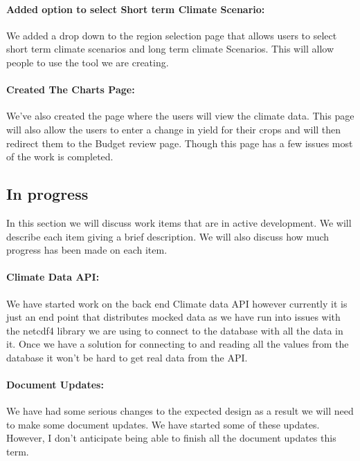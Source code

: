 \documentclass[onecolumn, draftclsnofoot,10pt, compsoc]{article}
\begin{document}
		\paragraph{Added option to select Short term Climate Scenario:} We added a drop down to the region selection page that allows users to select short term climate scenarios and long term climate Scenarios. This will allow people to use the tool we are creating.\\
		
		\paragraph{Created The Charts Page:} We've also created the page where the users will view the climate data. This page will also allow the users to enter a change in yield for their crops and will then redirect them to the Budget review page. Though this page has a few issues most of the work is completed.\\
		
		
	\subsection{In progress}
	In this section we will discuss work items that are in active development. We will describe each item giving a brief description. We will also discuss how much progress has been made on each item.\\
		
		\paragraph{Climate Data API:} We have started work on the back end Climate data API however currently it is just an end point that distributes mocked data as we have run into issues with the netcdf4 library we are using to connect to the database with all the data in it. Once we have a solution for connecting to and reading all the values from the database it won't be hard to get real data from the API.\\
		
		\paragraph{Document Updates:} We have had some serious changes to the expected design as a result we will need to make some document updates. We have started some of these updates. However, I don't anticipate being able to finish all the document updates this term.\\
	        
\end{document}
